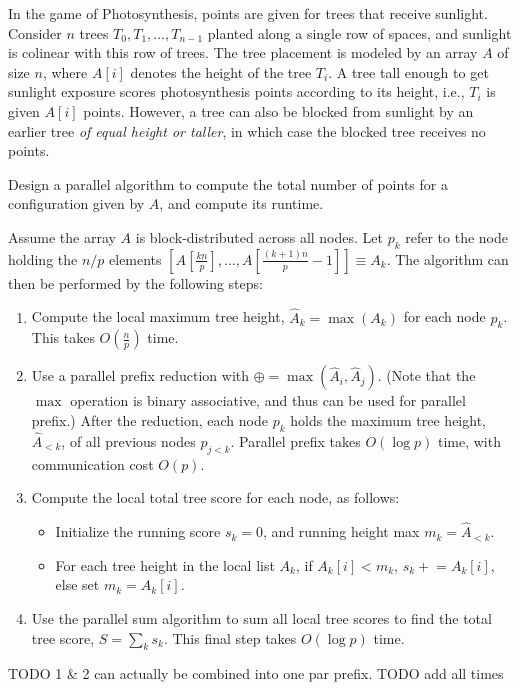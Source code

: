 \documentclass{article}
\newcommand{\?}{\stackrel{?}{=}}
\begin{document}
In the game of Photosynthesis, points are given for trees that receive sunlight.
Consider $n$ trees $T_0,T_1,...,T_{n-1}$ planted along a single row of spaces, and sunlight is colinear with this row of trees.
The tree placement is modeled by an array $A$ of size $n$, where $A[i]$ denotes the height of the tree $T_i$.
A tree tall enough to get sunlight exposure scores photosynthesis points according to its height, i.e., $T_i$ is given $A[i]$ points.
However, a tree can also be blocked from sunlight by an earlier tree \textit{of equal height or taller}, in which case the blocked tree receives no points.

Design a parallel algorithm to compute the total number of points for a configuration given by $A$, and compute its runtime. 

\quad Assume the array $A$ is block-distributed across all nodes.
Let $p_k$ refer to the node holding the $n/p$ elements $\left[A[\frac{kn}{p}], ..., A[\frac{(k + 1)n}{p} - 1]\right] \equiv A_k$.
The algorithm can then be performed by the following steps:
\begin{enumerate}
  \item Compute the local maximum tree height, $\hat{A}_k = \max{\left(A_k\right)}$ for each node $p_k$. 
  This takes $O\left(\frac{n}{p}\right)$ time.
  \item Use a parallel prefix reduction with $\oplus = \max(\hat{A}_i, \hat{A}_j)$.
  (Note that the $\max$ operation is binary associative, and thus can be used for parallel prefix.)
  After the reduction, each node $p_k$ holds the maximum tree height, $\hat{A}_{<k}$, of all previous nodes $p_{j<k}$.
  Parallel prefix takes $O(\log{p})$ time, with communication cost $O(p)$.
  \item Compute the local total tree score for each node, as follows:
  \begin{itemize}
    \item Initialize the running score $s_k = 0$, and running height max $m_k = \hat{A}_{<k}$.
    \item For each tree height in the local list $A_k$, if $A_k[i] < m_k$, $s_k \mathrel{+}= A_k[i]$, else set $m_k = A_k[i]$.
  \end{itemize}
  \item Use the parallel sum algorithm to sum all local tree scores to find the total tree score, $S = \sum \limits_{k} s_k$.
  This final step takes $O(\log{p})$ time.
\end{enumerate}

TODO 1 \& 2 can actually be combined into one par prefix.
TODO add all times
\end{document}

